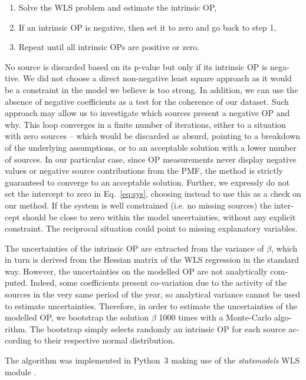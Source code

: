 \begin{otherlanguage}{english}
\begin{enumerate}
    \item
        Solve the WLS problem and estimate the intrinsic OP,
    \item
        If an intrinsic OP is negative, then set it to zero and go back to step
        1,
    \item
        Repeat until all intrinsic OPs are positive or zero.
\end{enumerate}

No source is discarded based on its p-value but only if its intrinsic OP
is negative. We did not choose a direct non-negative least square
approach as it would be a constraint in the model we believe is too strong. In addition,
we can use the absence of negative coefficients as a test for the
coherence of our dataset. Such approach may allow us to
investigate which sources present a negative OP and why. This loop
converges in a finite number of iterations, either to a situation with
zero sources -- which would be discarded as absurd, pointing to a
breakdown of the underlying assumptions, or to an acceptable solution
with a lower number of sources. In our particular case, since OP
measurements never display negative values or negative source
contributions from the PMF, the method is strictly guaranteed to
converge to an acceptable solution. Further, we expressly do not set the
intercept to zero in Eq.~\ref{eq:sys}, choosing instead to use this as a
check on our method. If the system is well constrained (i.e. no
missing sources) the intercept should be close to zero within the model
uncertainties, without any explicit constraint. The reciprocal situation
could point to missing explanatory variables.

The uncertainties of the intrinsic OP are extracted from the variance of
$\beta$, which in turn is derived from the Hessian matrix of the WLS
regression in the standard way. However, the uncertainties on the
modelled OP are not analytically computed. Indeed, some coefficients
present co-variation due to the activity of the sources in the very same
period of the year, so analytical variance cannot be used to estimate
uncertainties. Therefore, in order to estimate the uncertainties of the
modelled OP, we bootstrap the solution $\beta$ 1000 times with a Monte-Carlo
algorithm. The bootstrap simply selects randomly an intrinsic OP for
each source according to their respective normal distribution.

The algorithm was implemented in Python~3 making use of the
\emph{statsmodels} WLS module \parencite{seaboldStatsmodels2010}.



\end{otherlanguage}
